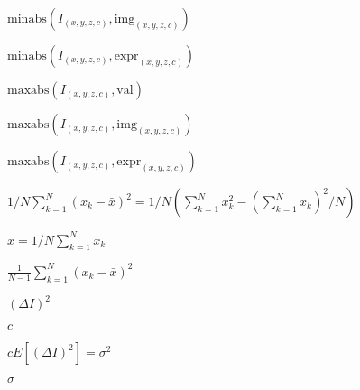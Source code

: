 \documentclass{article}
\begin{document}
$\mathrm{minabs}(I_{(x,y,z,c)},\mathrm{img}_{(x,y,z,c)})$
\pagebreak

$\mathrm{minabs}(I_{(x,y,z,c)},\mathrm{expr}_{(x,y,z,c)})$
\pagebreak

$\mathrm{maxabs}(I_{(x,y,z,c)},\mathrm{val})$
\pagebreak

$\mathrm{maxabs}(I_{(x,y,z,c)},\mathrm{img}_{(x,y,z,c)})$
\pagebreak

$\mathrm{maxabs}(I_{(x,y,z,c)},\mathrm{expr}_{(x,y,z,c)})$
\pagebreak

$1/N \sum\limits_{k=1}^{N} (x_k - \bar x)^2 =
1/N \left( \sum\limits_{k=1}^N x_k^2 - \left( \sum\limits_{k=1}^N x_k \right)^2 / N \right)$
\pagebreak

$ \bar x = 1/N \sum\limits_{k=1}^N x_k $
\pagebreak

$\frac{1}{N - 1} \sum\limits_{k=1}^{N} (x_k - \bar x)^2 $
\pagebreak

$(\Delta
I)^2 $
\pagebreak

$c$
\pagebreak

$ c E[(\Delta I)^2]=
\sigma^2$
\pagebreak

$\sigma$
\pagebreak
\end{document}

